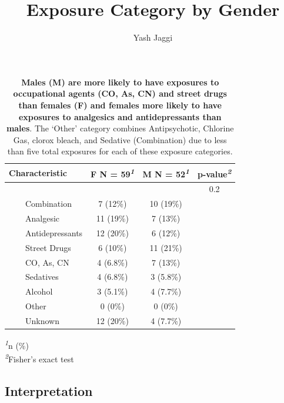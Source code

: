 \documentclass[
]{article}
\title{Exposure Category by Gender}
\author{Yash Jaggi}
\date{}
\begin{document}
\maketitle

\begin{table}[t]
\caption{\label{tab:summary_table}\textbf{Males (M) are more likely to have exposures to occupational agents (CO, As, CN) and street drugs than females (F) and females more likely to have exposures to analgesics and antidepressants than males}. The `Other' category combines Antipsychotic, Chlorine Gas, clorox bleach, and Sedative (Combination) due to less than five total exposures for each of these exposure categories.} 
\fontsize{12.0pt}{14.4pt}\selectfont
\begin{tabular*}{\linewidth}{@{\extracolsep{\fill}}lccc}
\toprule
\textbf{Characteristic} & \textbf{F}  N = 59\textsuperscript{\textit{1}} & \textbf{M}  N = 52\textsuperscript{\textit{1}} & \textbf{p-value}\textsuperscript{\textit{2}} \\ 
\midrule\addlinespace[2.5pt]
{\bfseries Exposure Category} &  &  & 0.2 \\ 
    Combination & 7 (12\%) & 10 (19\%) &  \\ 
    Analgesic & 11 (19\%) & 7 (13\%) &  \\ 
    Antidepressants & 12 (20\%) & 6 (12\%) &  \\ 
    Street Drugs & 6 (10\%) & 11 (21\%) &  \\ 
    CO, As, CN & 4 (6.8\%) & 7 (13\%) &  \\ 
    Sedatives & 4 (6.8\%) & 3 (5.8\%) &  \\ 
    Alcohol & 3 (5.1\%) & 4 (7.7\%) &  \\ 
    Other & 0 (0\%) & 0 (0\%) &  \\ 
    Unknown & 12 (20\%) & 4 (7.7\%) &  \\ 
\bottomrule
\end{tabular*}
\begin{minipage}{\linewidth}
\textsuperscript{\textit{1}}n (\%)\\
\textsuperscript{\textit{2}}Fisher's exact test\\
\end{minipage}
\end{table}

\subsection{Interpretation}\label{interpretation}
\end{document}
